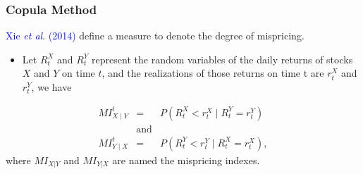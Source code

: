 \documentclass[pdf,10pt,xcolor=dvipsnames,hide notes]{beamer}
\begin{document}
	

\begin{frame}[label=frame4e]
	\frametitle{Copula Method}
	
	
	\textcolor{blue}{Xie \emph{et al}}. \textcolor{blue}{(2014)} define a measure to denote the degree of mispricing.
	
		\begin{definition}
		\begin{itemize}
			\item Let $R_{t}^{X}$ and $R_{t}^{Y}$ represent the random variables of the daily returns of stocks $X$ and $Y$ on time $t$, and
			the realizations of those returns on time t are $r_{t}^{X}$ and $r_{t}^{Y}$, we have
		\end{itemize}
		\begin{eqnarray*}
			MI_{X\mid Y}^{t} & = & P(R_{t}^{X}<r_{t}^{X}\mid R_{t}^{Y}=r_{t}^{Y}) \\
			& \text{and}  & \\
			MI_{Y\mid X}^{t} & = & P(R_{t}^{Y}<r_{t}^{Y}\mid R_{t}^{X}=r_{t}^{X}),
		\end{eqnarray*}
		where $MI_{X|Y}$ and $MI_{Y|X}$ are named the mispricing indexes.
	\end{definition}
\end{frame}
\end{document}
